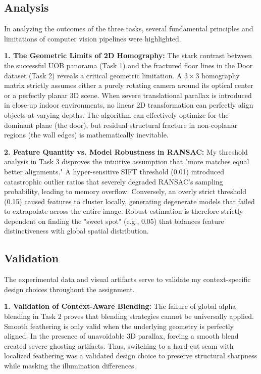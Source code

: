 \documentclass{Resources/UoBLab1}
\begin{document}
    \subsection{Analysis}
    In analyzing the outcomes of the three tasks, several fundamental principles
    and limitations of computer vision pipelines were highlighted.

    \textbf{1. The Geometric Limits of 2D Homography:} The stark contrast
    between the successful UOB panorama (Task 1) and the fractured floor lines
    in the Door dataset (Task 2) reveals a critical geometric limitation. A $3 \times
    3$ homography matrix strictly assumes either a purely rotating camera around
    its optical center or a perfectly planar 3D scene. When severe translational
    parallax is introduced in close-up indoor environments, no linear 2D transformation
    can perfectly align objects at varying depths. The algorithm can effectively
    optimize for the dominant plane (the door), but residual structural fracture
    in non-coplanar regions (the wall edges) is mathematically inevitable.

    \textbf{2. Feature Quantity vs. Model Robustness in RANSAC:} My threshold
    analysis in Task 3 disproves the intuitive assumption that "more matches equal
    better alignments." A hyper-sensitive SIFT threshold (0.01) introduced catastrophic
    outlier ratios that severely degraded RANSAC's sampling probability, leading
    to memory overflow. Conversely, an overly strict threshold (0.15) caused
    features to cluster locally, generating degenerate models that failed to extrapolate
    across the entire image. Robust estimation is therefore strictly dependent
    on finding the "sweet spot" (e.g., 0.05) that balances feature
    distinctiveness with global spatial distribution.

    \subsection{Validation}
    The experimental data and visual artifacts serve to validate my context-specific
    design choices throughout the assignment.

    \textbf{1. Validation of Context-Aware Blending:} The failure of global alpha
    blending in Task 2 proves that blending strategies cannot be universally applied.
    Smooth feathering is only valid when the underlying geometry is perfectly
    aligned. In the presence of unavoidable 3D parallax, forcing a smooth blend
    created severe ghosting artifacts. Thus, switching to a hard-cut seam with
    localized feathering was a validated design choice to preserve structural
    sharpness while masking the illumination differences.
\end{document}
